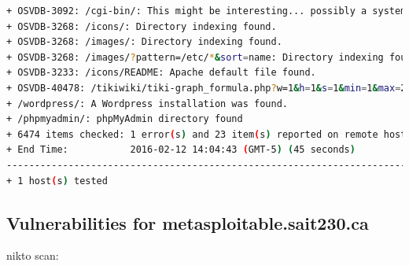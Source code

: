 \documentclass{article}
\begin{document}
\begin{lstlisting}[language=Bash]
+ OSVDB-3092: /cgi-bin/: This might be interesting... possibly a system shell found.
+ OSVDB-3268: /icons/: Directory indexing found.
+ OSVDB-3268: /images/: Directory indexing found.
+ OSVDB-3268: /images/?pattern=/etc/*&sort=name: Directory indexing found.
+ OSVDB-3233: /icons/README: Apache default file found.
+ OSVDB-40478: /tikiwiki/tiki-graph_formula.php?w=1&h=1&s=1&min=1&max=2&f[]=x.tan.phpinfo()&t=png&title=http://cirt.net/rfiinc.txt?: TikiWiki contains a vulnerability which allows remote attackers to execute arbitrary PHP code.
+ /wordpress/: A Wordpress installation was found.
+ /phpmyadmin/: phpMyAdmin directory found
+ 6474 items checked: 1 error(s) and 23 item(s) reported on remote host
+ End Time:           2016-02-12 14:04:43 (GMT-5) (45 seconds)
---------------------------------------------------------------------------
+ 1 host(s) tested
\end{lstlisting}

\subsection{Vulnerabilities for metasploitable.sait230.ca}

nikto scan:
\end{document}
